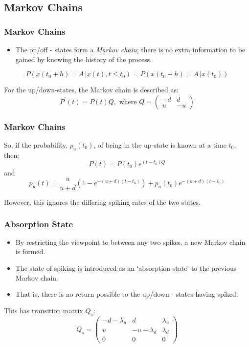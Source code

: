 \documentclass{beamer}
\begin{document}
\subsection{Markov Chains}
\begin{frame}
\frametitle{Markov Chains}
\begin{itemize}
\item The on/off - states form a \emph{Markov chain}; there is no extra information to be gained by knowing the history of the process.
\end{itemize}
\begin{equation*}
P\left( x(t_0+h)=A \,| x(t), t \leq t_0 \right) = P \left( x(t_0+h)=A \,| x(t_0)\right)
\end{equation*}
\pause

For the up/down-states, the Markov chain is described as:
\begin{equation*}
P^\prime (t)= P(t)Q, \mbox{ where } Q = \begin{pmatrix} -d & d \\ u & -u \end{pmatrix}
\end{equation*}
\end{frame}

\begin{frame}
\frametitle{Markov Chains}
So, if the probability, $p_u(t_0)$, of being in the up-state is known at a time $t_0$, then:
\begin{equation*}
P(t) = P(t_0)e^{(t-t_0)Q}
\end{equation*}
and 
\begin{equation*}
 p_u(t) = \frac{u}{u+d}\left( 1 - e^{-(u+d)(t-t_0)}\right) + p_u(t_0)e^{-(u+d)(t-t_0)}
\end{equation*}
\pause

However, this ignores the differing spiking rates of the two states.
\end{frame}

\begin{frame}
\frametitle{Absorption State}
\begin{itemize}
\item By restricting the viewpoint to between any two spikes, a new Markov chain is formed.
\pause
\item The state of spiking is introduced as an \lq{}absorption state\rq{} to the previous Markov chain.
\pause
\item That is, there is no return possible to the up/down - states having spiked.
\end{itemize}
\pause
This has transition matrix $Q_s$:
\begin{equation*}
Q_s = \begin{pmatrix} -d-\lambda_u & d & \lambda_u \\ u & -u-\lambda_d & \lambda_d \\ 0 & 0 & 0 \end{pmatrix}
\end{equation*}
\end{frame}
\end{document}
